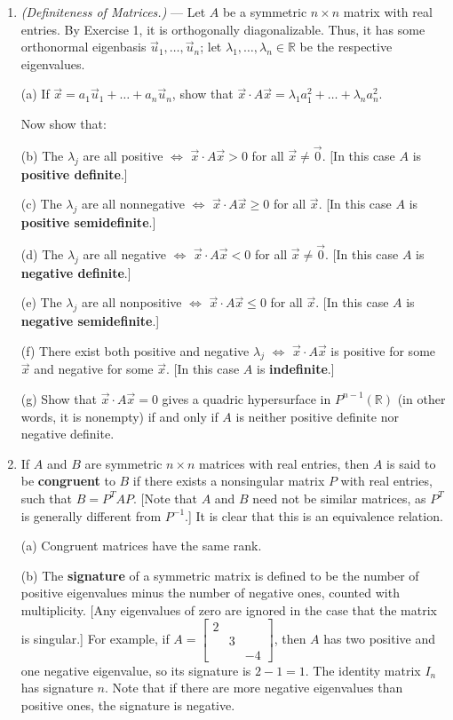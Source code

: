 \documentclass[leqno]{book}
\begin{document}
\begin{enumerate}
\item\emph{(Definiteness of Matrices.)} \---- Let $A$ be a symmetric $n\times n$ matrix with real entries.  By Exercise 1, it is orthogonally diagonalizable.  Thus, it has some orthonormal eigenbasis $\vec u_1,\dots,\vec u_n$; let $\lambda_1,\dots,\lambda_n\in\mathbb R$ be the respective eigenvalues.

(a) If $\vec x=a_1\vec u_1+\dots+a_n\vec u_n$, show that $\vec x\cdot A\vec x=\lambda_1a_1^2+\dots+\lambda_na_n^2$.

Now show that:

(b) The $\lambda_j$ are all positive $\iff$ $\vec x\cdot A\vec x>0$ for all $\vec x\ne\vec 0$.  [In this case $A$ is \textbf{positive definite}.]

(c) The $\lambda_j$ are all nonnegative $\iff$ $\vec x\cdot A\vec x\geqslant 0$ for all $\vec x$.  [In this case $A$ is \textbf{positive semidefinite}.]

(d) The $\lambda_j$ are all negative $\iff$ $\vec x\cdot A\vec x<0$ for all $\vec x\ne\vec 0$.  [In this case $A$ is \textbf{negative definite}.]

(e) The $\lambda_j$ are all nonpositive $\iff$ $\vec x\cdot A\vec x\leqslant 0$ for all $\vec x$.  [In this case $A$ is \textbf{negative semidefinite}.]

(f) There exist both positive and negative $\lambda_j$ $\iff$ $\vec x\cdot A\vec x$ is positive for some $\vec x$ and negative for some $\vec x$.  [In this case $A$ is \textbf{indefinite}.]

(g) Show that $\vec x\cdot A\vec x=0$ gives a quadric hypersurface in $P^{n-1}(\mathbb R)$ (in other words, it is nonempty) if and only if $A$ is neither positive definite nor negative definite.

\item If $A$ and $B$ are symmetric $n\times n$ matrices with real entries, then $A$ is said to be \textbf{congruent} to $B$ if there exists a nonsingular matrix $P$ with real entries, such that $B=P^TAP$.  [Note that $A$ and $B$ need not be similar matrices, as $P^T$ is generally different from $P^{-1}$.]  It is clear that this is an equivalence relation.

(a) Congruent matrices have the same rank.

(b) The \textbf{signature} of a symmetric matrix is defined to be the number of positive eigenvalues minus the number of negative ones, counted with multiplicity.  [Any eigenvalues of zero are ignored in the case that the matrix is singular.]  For example, if $A=\begin{bmatrix}2\\&3\\&&-4\end{bmatrix}$, then $A$ has two positive and one negative eigenvalue, so its signature is $2-1=1$.  The identity matrix $I_n$ has signature $n$.  Note that if there are more negative eigenvalues than positive ones, the signature is negative.


\end{enumerate}
\end{document}
